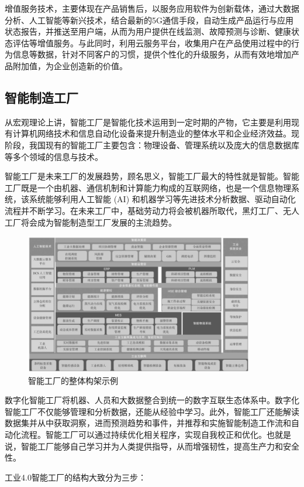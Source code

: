 \documentclass[lang=cn,12pt,bibtex,newtx,twoside,margintrue,citestyle=gb7714-2015, bibstyle=gb7714-2015]{elegantbook}
\begin{document}
增值服务技术，主要体现在产品销售后，以服务应用软件为创新载体，通过大数据分析、人工智能等新兴技术，结合最新的5G通信手段，自动生成产品运行与应用状态报告，并推送至用户端，从而为用户提供在线监测、故障预测与诊断、健康状态评估等增值服务。与此同时，利用云服务平台，收集用户在产品使用过程中的行为信息等数据，针对不同客户的习惯，提供个性化的升级服务，从而有效地增加产品附加值，为企业创造新的价值。

\subsection{智能制造工厂}
\label{sec:org8b3b9d7}
从宏观理论上讲，智能工厂是智能化技术运用到一定时期的产物，它主要是利用现有计算机网络技术和信息自动化设备来提升制造业的整体水平和企业经济效益。现阶段，我国现有的智能工厂主要包含：物理设备、管理系统以及庞大的信息数据库等多个领域的信息与技术\cite{杨鹏2019}。

智能工厂是未来工厂的发展趋势，顾名思义，智能工厂最大的特性就是智能。智能工厂既是一个由机器、通信机制和计算能力构成的互联网络，也是一个信息物理系统，该系统能够利用人工智能 (AI) 和机器学习等先进技术分析数据、驱动自动化流程并不断学习。在未来工厂中，基础劳动力将会被机器所取代，黑灯工厂、无人工厂将会成为智能制造型工厂发展的主流趋势。

\begin{figure}[htbp]
\centering
\includegraphics[angle=0,width=10cm]{./figure/3.2.png}
\caption{\label{3.2}智能工厂的整体构架示例}
\end{figure}

数字化智能工厂将机器、人员和大数据整合到统一的数字互联生态体系中。数字化智能工厂不仅能够管理和分析数据，还能从经验中学习。此外，智能工厂还能解读数据集并从中获取洞察，进而预测趋势和事件，并推荐和实施智能制造工作流和自动化流程。智能工厂可以通过持续优化相关程序，实现自我校正和优化。也就是说，智能工厂能够自己学习并为人类提供指导，从而增强韧性，提高生产力和安全性。

工业4.0智能工厂的结构大致分为三步：
\end{document}
